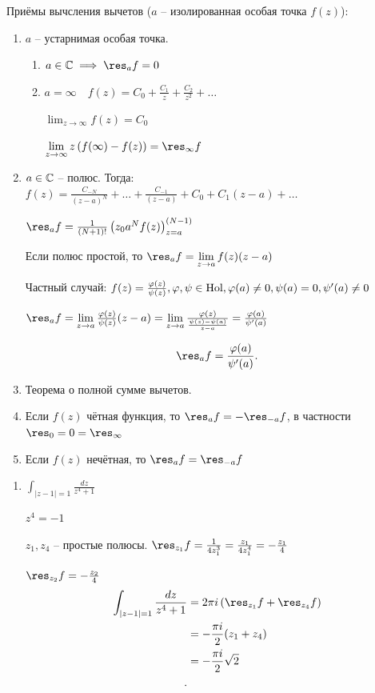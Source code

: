Приёмы вычсления вычетов ($a$ -- изолированная особая точка $f(z)$):
\begin{enumerate}
    \item $a$ -- устарнимая особая точка.
    \begin{enumerate}
        \item $a\in \C \implies \res_a f = 0$
        \item $a = \infty \quad f(z) = C_0 + \frac{C_1}{z} + \frac{C_2}{z^2} + \ldots$

        $\lim_{z \to \infty} f(z) = C_0$

        $\lim_{z \to \infty} z\left( f(\infty ) - f(z) \right) = \res_{\infty }f  $
    \end{enumerate}
    \item $a\in \mathbb{C}$ -- полюс. Тогда:
    $f(z) = \frac{C_{-N}}{(z-a)^N} + \ldots + \frac{C_{-1}}{(z-a)} + C_0 + C_1(z-a) + \ldots$

    $\res_af = \frac{1}{(N+1)!} \left( z_0 a^N f(z) \right) ^{(N-1)}_{z=a}$

    Если полюс простой, то $\res_af = \lim_{z \to a} f(z)(z-a)$

    Частный случай: $f(z) = \frac{\varphi(z)}{\psi(z)}, \varphi, \psi\in \mathrm{Hol}, \varphi(a) \neq 0, \psi(a) = 0, \psi^{\prime}(a) \neq 0$

    $\res_af = \lim_{z \to a} \frac{\varphi(z)}{\psi(z)}(z-a) = \lim_{z \to a} \frac{\varphi(z)}{\frac{\psi(z) - \psi(a)}{z - a}} = \frac{\varphi(a)}{\p\psi(a)}$

    \[
    \res_af = \frac{\varphi(a)}{\p\psi(a)}
    .\]
    \item Теорема о полной сумме вычетов.
    \item Если $f(z)$ чётная функция, то $\res_af = - \res_{-a}f$, в частности $\res_0 = 0 = \res_{\infty }$
    \item Если $f(z)$ нечётная, то $\res_af = \res_{-a}f$
\end{enumerate}

\begin{example}
    \begin{enumerate}
        \item $\int_{|z-1| = 1} \frac{dz}{z^4 +1}$

        $z^4 = -1$

        $z_1, z_4$ -- простые полюсы. $\res_{z_1}f = \frac{1}{4z_1^3} = \frac{z_1}{4z_1^4}  = - \frac{z_1}{4}$

        $\res_{z_2}f = -\frac{z_2}{4}$
        \begin{align*}
            \int_{|z-1| = 1} \frac{dz}{z^4 +1} &= 2\pi i\left( \res_{z_1} f + \res_{z_4} f \right)  \\
            &= -\frac{\pi i}{2}(z_1 + z_4) \\
            &= - \frac{\pi i}{2}\sqrt{2}  \\
        .\end{align*}
    \end{enumerate}
\end{example}



